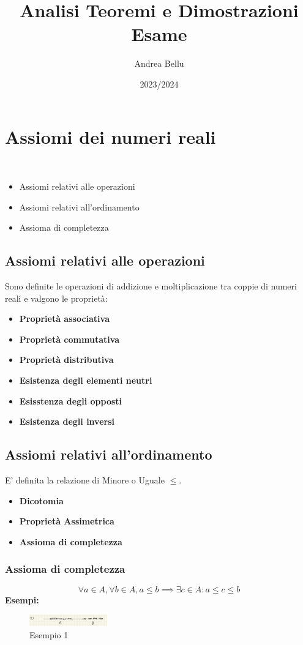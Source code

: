 \documentclass{article}
\title{Analisi Teoremi e Dimostrazioni Esame}
\author{Andrea Bellu}
\date{2023/2024}
\begin{document}
\maketitle

\tableofcontents

\section{Assiomi dei numeri reali}\
\begin{itemize}
    \item Assiomi relativi alle operazioni
    \item Assiomi relativi all'ordinamento
    \item Assioma di completezza
\end{itemize}

\subsection{Assiomi relativi alle operazioni}
Sono definite le operazioni di addizione e moltiplicazione tra coppie di numeri
reali e valgono le proprietà:
\begin{itemize}
    \item \textbf{Proprietà associativa}
    \item \textbf{Proprietà commutativa}
    \item \textbf{Proprietà distributiva}
    \item \textbf{Esistenza degli elementi neutri}
    \item \textbf{Esisstenza degli opposti}
    \item \textbf{Esistenza degli inversi}
\end{itemize}

\subsection{Assiomi relativi all'ordinamento}
E' definita la relazione di Minore o Uguale $\leq$.
\begin{itemize}
    \item \textbf{Dicotomia}
    \item \textbf{Proprietà Assimetrica}
    \item \textbf{Assioma di completezza}
\end{itemize}

\subsubsection{Assioma di completezza}
\[
    \forall a \in A, \forall b \in A, a \leq b  \implies \exists c \in A : a \leq c \leq b
\]
\newpage
\textbf{Esempi:}\\
\begin{figure}[h]
    \centering
    \includegraphics[width=0.3\textwidth]{1.png}
    \caption{Esempio 1}
    \label{fig:1}
\end{figure}
\end{document}
